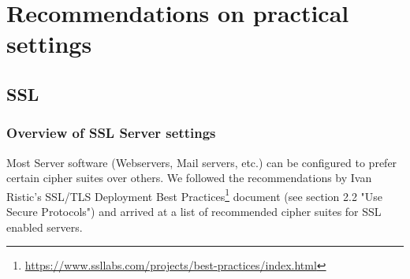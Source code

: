 \section{Recommendations on practical settings}


\subsection{SSL}

%

\subsubsection{Overview of SSL Server settings}

Most Server software (Webservers, Mail servers, etc.) can be configured to prefer certain cipher suites over others. 
We followed the recommendations by Ivan Ristic's SSL/TLS Deployment Best Practices\footnote{\url{https://www.ssllabs.com/projects/best-practices/index.html}} document (see section 2.2 "Use Secure Protocols") and arrived at a list of recommended cipher suites for SSL enabled servers.

